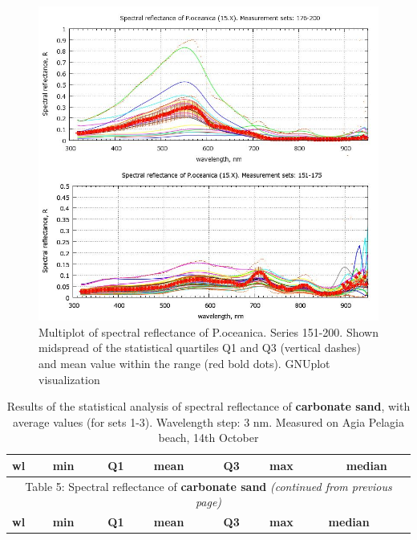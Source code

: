 \documentclass[10pt, a4paper]{article}
\begin{document}
\begin{appendices}
\begin{figure}[H]
\begin{center}
\includegraphics[scale=0.4]{GNU-15.jpg}
\caption{Multiplot of spectral reflectance of P.oceanica. Series 151-200. Shown midspread of the statistical quartiles Q1 and Q3 (vertical dashes) and
mean value within the range (red bold dots). GNUplot visualization­}
\label{fig:57}
\end{center}
\end{figure}
\pagebreak

\begin{longtable}{|r|r|r|r|r|r|r|}
\caption{Results of the statistical analysis of spectral reflectance of \textbf{carbonate sand}, with average values (for sets 1-3). Wavelength step: 3 nm. Measured on Agia Pelagia beach, 14th October}
\label{tab:17} \\
\hline
  \multicolumn{1}{|l|}{\textbf{wl}} &
   \multicolumn{1}{l|}{\textbf{min}} & 
   \multicolumn{1}{l|}{\textbf{Q1}} & 
   \multicolumn{1}{l|}{\textbf{mean}} & 
   \multicolumn{1}{l|}{\textbf{Q3}} & 
   \multicolumn{1}{l|}{\textbf{max}} & 
   \multicolumn{1}{c|}{\textbf{median}} \\ \hline
\endfirsthead

\multicolumn{7}{c}{Table 5: Spectral reflectance of \textbf{carbonate sand} \textit{(continued from previous page)}}\\
\hline \multicolumn{1}{|l|}{\textbf{wl}} & \multicolumn{1}{l|}{\textbf{min}} & \multicolumn{1}{l|}{\textbf{Q1}} & \multicolumn{1}{l|}{\textbf{mean}} & \multicolumn{1}{l|}{\textbf{Q3}} & \multicolumn{1}{l|}{\textbf{max}} & \multicolumn{1}{l|}{\textbf{median}} \\ \hline
\endhead


\end{longtable}
\end{appendices}
\end{document}
